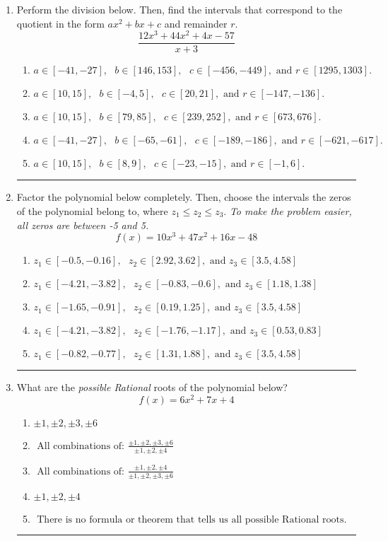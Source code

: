 \documentclass[14pt]{extbook}
\newcommand{\litem}[1]{\item#1\hspace*{-1cm}\rule{\textwidth}{0.4pt}}
\begin{document}
\begin{enumerate}
{\begin{enumerate}[label=\Alph*.]
\end{enumerate} }
\litem{
Perform the division below. Then, find the intervals that correspond to the quotient in the form $ax^2+bx+c$ and remainder $r$.\[ \frac{12x^{3} +44 x^{2} +4 x -57}{x + 3} \]\begin{enumerate}[label=\Alph*.]
\item \( a \in [-41, -27], \text{   } b \in [146, 153], \text{   } c \in [-456, -449], \text{   and   } r \in [1295, 1303]. \)
\item \( a \in [10, 15], \text{   } b \in [-4, 5], \text{   } c \in [20, 21], \text{   and   } r \in [-147, -136]. \)
\item \( a \in [10, 15], \text{   } b \in [79, 85], \text{   } c \in [239, 252], \text{   and   } r \in [673, 676]. \)
\item \( a \in [-41, -27], \text{   } b \in [-65, -61], \text{   } c \in [-189, -186], \text{   and   } r \in [-621, -617]. \)
\item \( a \in [10, 15], \text{   } b \in [8, 9], \text{   } c \in [-23, -15], \text{   and   } r \in [-1, 6]. \)

\end{enumerate} }
\litem{
Factor the polynomial below completely. Then, choose the intervals the zeros of the polynomial belong to, where $z_1 \leq z_2 \leq z_3$. \textit{To make the problem easier, all zeros are between -5 and 5.}\[ f(x) = 10x^{3} +47 x^{2} +16 x -48 \]\begin{enumerate}[label=\Alph*.]
\item \( z_1 \in [-0.5, -0.16], \text{   }  z_2 \in [2.92, 3.62], \text{   and   } z_3 \in [3.5, 4.58] \)
\item \( z_1 \in [-4.21, -3.82], \text{   }  z_2 \in [-0.83, -0.6], \text{   and   } z_3 \in [1.18, 1.38] \)
\item \( z_1 \in [-1.65, -0.91], \text{   }  z_2 \in [0.19, 1.25], \text{   and   } z_3 \in [3.5, 4.58] \)
\item \( z_1 \in [-4.21, -3.82], \text{   }  z_2 \in [-1.76, -1.17], \text{   and   } z_3 \in [0.53, 0.83] \)
\item \( z_1 \in [-0.82, -0.77], \text{   }  z_2 \in [1.31, 1.88], \text{   and   } z_3 \in [3.5, 4.58] \)

\end{enumerate} }
\litem{
What are the \textit{possible Rational} roots of the polynomial below?\[ f(x) = 6x^{2} +7 x + 4 \]\begin{enumerate}[label=\Alph*.]
\item \( \pm 1,\pm 2,\pm 3,\pm 6 \)
\item \( \text{ All combinations of: }\frac{\pm 1,\pm 2,\pm 3,\pm 6}{\pm 1,\pm 2,\pm 4} \)
\item \( \text{ All combinations of: }\frac{\pm 1,\pm 2,\pm 4}{\pm 1,\pm 2,\pm 3,\pm 6} \)
\item \( \pm 1,\pm 2,\pm 4 \)
\item \( \text{ There is no formula or theorem that tells us all possible Rational roots.} \)


\end{enumerate}}
\end{enumerate}
\end{document}

